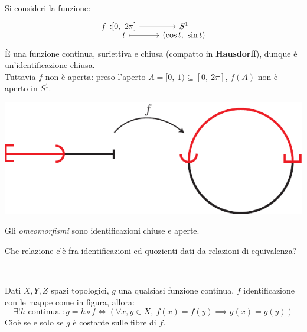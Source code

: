 \begin{example}
	Si consideri la funzione:
	\begin{equation*}
		\funztot f {[0, \ 2\pi]} {S^1} t {(\cos t, \ \sin t)}
	\end{equation*}
	È una funzione continua, suriettiva e chiusa (compatto in \textbf{Hausdorff}), dunque è un'identificazione chiusa. \\
	Tuttavia $f$ non è aperta: preso l'aperto $A=[0, \ 1)\subseteq [0, \ 2\pi]$, $f(A)$ non è aperto in $S^1$.
		\begin{center}
			\includegraphics[trim=0cm 0cm 0cm 0cm,clip,scale=0.9]{images/half_circle-eps-converted-to.pdf}
		\end{center}
	\vspace{-6mm}
\end{example}
\begin{observe}
	Gli \textit{omeomorfismi} sono identificazioni chiuse e aperte.
\end{observe}
Che relazione c'è fra identificazioni ed quozienti dati da relazioni di equivalenza?
\begin{theorema}~{}\\
\begin{minipage}[t]{0.83\textwidth}
		Dati $X,Y,Z$ spazi topologici, $g$ una qualsiasi funzione continua, $f$ identificazione con le mappe come in figura, allora:
		\begin{equation*}
			\exists! h \text{ continua } \colon g=h\circ f \iff \left( \forall x,y\in X, \ f(x)=f(y)\implies g(x)=g(y)  \right)
		\end{equation*}
	\vspace{-2mm}
		Cioè se e solo se $g$ è costante sulle fibre di $f$.
\end{minipage}
	\begin{minipage}[t]{0.13\textwidth}\vspace{-10pt}
	\end{minipage}
\end{theorema}
